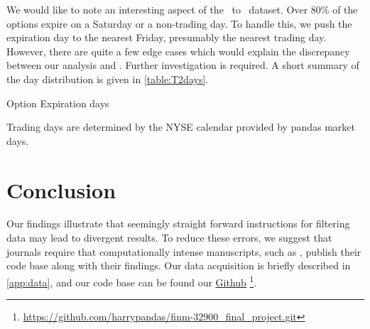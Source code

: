 We would like to note an interesting aspect of the \STARTONE\ to \ENDONE\ dataset. Over 80\% of the options expire on a Saturday or a non-trading day. To handle this, we push the expiration day to the nearest Friday, presumably the nearest trading day. However, there are quite a few edge cases which would explain the discrepancy between our analysis and \citet{constantinides2013}. Further investigation is required. A short summary of the day distribution is given in \autoref{table:T2days}. 



\begin{table}[ht]

\centering
{}
\caption{Option Expiration days}



\caption*{Trading days are determined by the NYSE calendar provided by pandas market days. }
\label{table:T2days}
\end{table}






\section{Conclusion} 

Our findings illustrate that seemingly straight forward instructions for filtering data may lead to divergent results. To reduce these errors, we suggest that journals require that computationally intense manuscripts, such as \citet{constantinides2013}, publish their code base along with their findings. Our data acquisition is briefly described in \autoref{app:data}, and our code base can be found our \href{https://github.com/harrypandas/finm-32900_final_project.git}{Github} \footnote{ \url{https://github.com/harrypandas/finm-32900_final_project.git} }.





\newpage

% 

